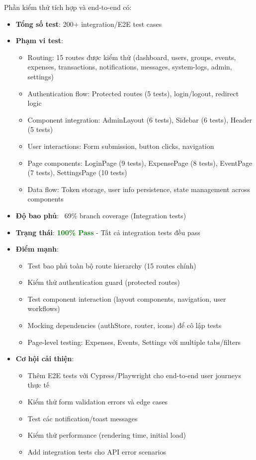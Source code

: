 \documentclass[12pt,a4paper,vietnamese]{article}
\begin{document}
Phần kiểm thử tích hợp và end-to-end có:
\begin{itemize}
    \item \textbf{Tổng số test}: 200+ integration/E2E test cases
    \item \textbf{Phạm vi test}:
    \begin{itemize}
        \item Routing: 15 routes được kiểm thử (dashboard, users, groups, events, expenses, transactions, notifications, messages, system-logs, admin, settings)
        \item Authentication flow: Protected routes (5 tests), login/logout, redirect logic
        \item Component integration: AdminLayout (6 tests), Sidebar (6 tests), Header (5 tests)
        \item User interactions: Form submission, button clicks, navigation
        \item Page components: LoginPage (9 tests), ExpensePage (8 tests), EventPage (7 tests), SettingsPage (10 tests)
        \item Data flow: Token storage, user info persistence, state management across components
    \end{itemize}
    \item \textbf{Độ bao phủ}: ~69\% branch coverage (Integration tests)
    \item \textbf{Trạng thái}: \textcolor{green}{\textbf{100\% Pass}} - Tất cả integration tests đều pass
    \item \textbf{Điểm mạnh}:
    \begin{itemize}
        \item Test bao phủ toàn bộ route hierarchy (15 routes chính)
        \item Kiểm thử authentication guard (protected routes)
        \item Test component interaction (layout components, navigation, user workflows)
        \item Mocking dependencies (authStore, router, icons) để cô lập tests
        \item Page-level testing: Expenses, Events, Settings với multiple tabs/filters
    \end{itemize}
    \item \textbf{Cơ hội cải thiện}:
    \begin{itemize}
        \item Thêm E2E tests với Cypress/Playwright cho end-to-end user journeys thực tế
        \item Kiểm thử form validation errors và edge cases
        \item Test các notification/toast messages
        \item Kiểm thử performance (rendering time, initial load)
        \item Add integration tests cho API error scenarios
    \end{itemize}
\end{itemize}
\end{document}
